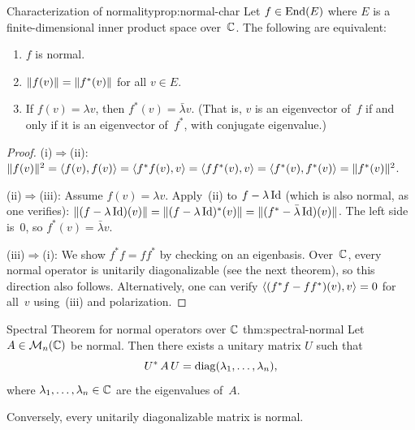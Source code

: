 \begin{proposition}{Characterization of normality}{prop:normal-char}
Let $f\in\operatorname{End}(E)$ where $E$ is a finite-dimensional inner product space
over~${\mathbb{C}}$.  The following are equivalent:
\begin{enumerate}[label=\textup{(\roman*)}]
  \item $f$ is normal.
  \item $\lVert f(v)\rVert = \lVert f^*(v)\rVert$ for all $v\in E$.
  \item If $f(v)=\lambda v$, then $f^*(v)=\bar\lambda v$.
    (That is, $v$ is an eigenvector of~$f$ if and only if it is an
    eigenvector of~$f^*$, with conjugate eigenvalue.)
\end{enumerate}
\end{proposition}

\begin{proof}
(i)$\Rightarrow$(ii): $\lVert f(v)\rVert^2 = \langle f(v),f(v)\rangle
= \langle f^*f(v),v\rangle = \langle ff^*(v),v\rangle = \langle f^*(v),f^*(v)\rangle
= \lVert f^*(v)\rVert^2$.

(ii)$\Rightarrow$(iii): Assume $f(v)=\lambda v$.  Apply~(ii) to
$f-\lambda\operatorname{Id}$ (which is also normal, as one verifies):
$\lVert(f-\lambda\operatorname{Id})(v)\rVert=\lVert(f-\lambda\operatorname{Id})^*(v)\rVert
=\lVert(f^*-\bar\lambda\operatorname{Id})(v)\rVert$.
The left side is~$0$, so $f^*(v)=\bar\lambda v$.

(iii)$\Rightarrow$(i): We show $f^*f = ff^*$ by checking on an
eigenbasis.  Over~${\mathbb{C}}$, every normal operator is unitarily
diagonalizable (see the next theorem), so this direction also follows.
Alternatively, one can verify
$\langle(f^*f-ff^*)(v),v\rangle=0$ for all~$v$ using~(iii) and polarization.
\end{proof}

\begin{theorem}{Spectral Theorem for normal operators over ${\mathbb{C}}$}%
{thm:spectral-normal}
Let $A\in\mathcal{M}_n({\mathbb{C}})$ be normal.  Then there exists a unitary matrix
$U$ such that
\[
  {U}^{*}\,A\,U = \operatorname{diag}(\lambda_1,\ldots,\lambda_n),
\]
where $\lambda_1,\ldots,\lambda_n\in{\mathbb{C}}$ are the eigenvalues of~$A$.

Conversely, every unitarily diagonalizable matrix is normal.
\end{theorem}

